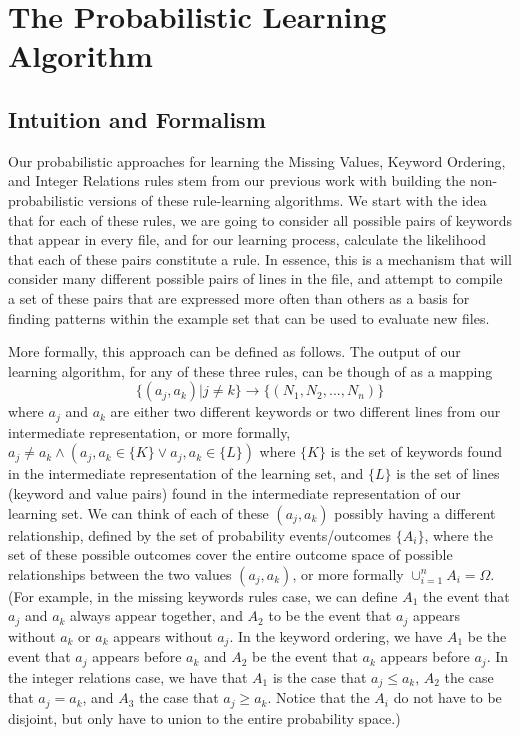 \documentclass[12pt]{article}
\begin{document}
\section{The Probabilistic Learning Algorithm}

\subsection{Intuition and Formalism}
Our probabilistic approaches for learning the Missing Values, Keyword Ordering, and Integer Relations rules stem from our previous work with building the non-probabilistic versions of these rule-learning algorithms. We start with the idea that for each of these rules, we are going to consider all possible pairs of keywords that appear in every file, and for our learning process, calculate the likelihood that each of these pairs constitute a rule. In essence, this is a mechanism that will consider many different possible pairs of lines in the file, and attempt to compile a set of these pairs that are expressed more often than others as a basis for finding patterns within the example set that can be used to evaluate new files.

More formally, this approach can be defined as follows. The output of our learning algorithm, for any of these three rules, can be though of as a mapping
\[
\{ (a_j, a_k) | j \neq k \} \rightarrow \{ (N_1, N_2, ... , N_n) \}
\]
where $a_j$ and $a_k$ are either two different keywords or two different lines from our intermediate representation, or more formally, $a_j \neq a_k \wedge (a_j, a_k \in \{ K \} \vee a_j, a_k \in \{ L \})$ where $\{ K \}$ is the set of keywords found in the intermediate representation of the learning set, and $\{ L \}$ is the set of lines (keyword and value pairs) found in the intermediate representation of our learning set. We can think of each of these $(a_j, a_k)$ possibly having a different relationship, defined by the set of probability events/outcomes $\{ A_i \}$, where the set of these possible outcomes cover the entire outcome space of possible relationships between the two values $(a_j, a_k)$, or more formally $\cup_{i = 1}^n A_i = \Omega$. (For example, in the missing keywords rules case, we can define $A_1$ the event that $a_j$ and $a_k$ always appear together, and $A_2$ to be the event that $a_j$ appears without $a_k$ or $a_k$ appears without $a_j$. In the keyword ordering, we have $A_1$ be the event that $a_j$ appears before $a_k$ and $A_2$ be the event that $a_k$ appears before $a_j$. In the integer relations case, we have that $A_1$ is the case that $a_j \leq a_k$, $A_2$ the case that $a_j = a_k$, and $A_3$ the case that $a_j \geq a_k$. Notice that the $A_i$ do not have to be disjoint, but only have to union to the entire probability space.)
\end{document}
